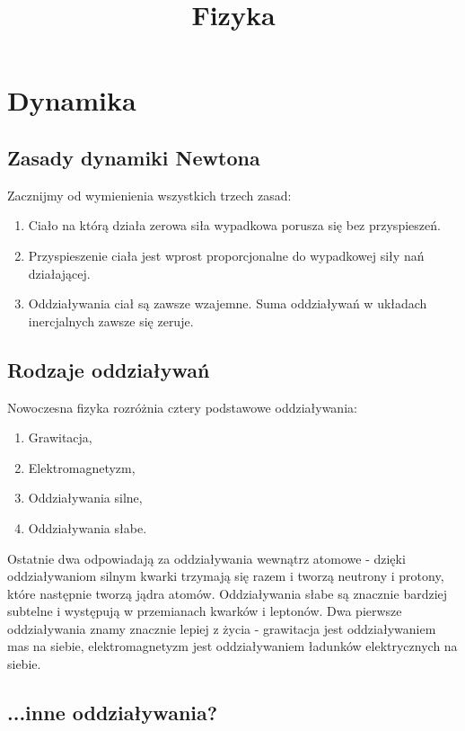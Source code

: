 \documentclass[11pt]{article}
\title{Fizyka}
\theoremstyle{definition}
\numberwithin{zad}{section}
\begin{document}
\maketitle
\tableofcontents

\section{Dynamika}
\subsection{Zasady dynamiki Newtona}

Zacznijmy od wymienienia wszystkich trzech zasad:

\begin{enumerate}
\item Ciało na którą działa zerowa siła wypadkowa porusza się bez przyspieszeń.
\item Przyspieszenie ciała jest wprost proporcjonalne do wypadkowej siły nań działającej.
\item Oddziaływania ciał są zawsze wzajemne. Suma oddziaływań w układach inercjalnych zawsze się zeruje.
\end{enumerate}

\subsection{Rodzaje oddziaływań}

Nowoczesna fizyka rozróżnia cztery podstawowe oddziaływania:

\begin{enumerate}
\item Grawitacja,
\item Elektromagnetyzm,
\item Oddziaływania silne,
\item Oddziaływania słabe.
\end{enumerate}

Ostatnie dwa odpowiadają za oddziaływania wewnątrz atomowe - dzięki oddziaływaniom silnym kwarki trzymają się razem i tworzą neutrony i protony, które następnie tworzą jądra atomów. Oddziaływania słabe są znacznie bardziej subtelne i występują w przemianach kwarków i leptonów. Dwa pierwsze oddziaływania znamy znacznie lepiej z życia - grawitacja jest oddziaływaniem mas na siebie, elektromagnetyzm jest oddziaływaniem ładunków elektrycznych na siebie.

\subsection{...inne oddziaływania?}
\end{document}
